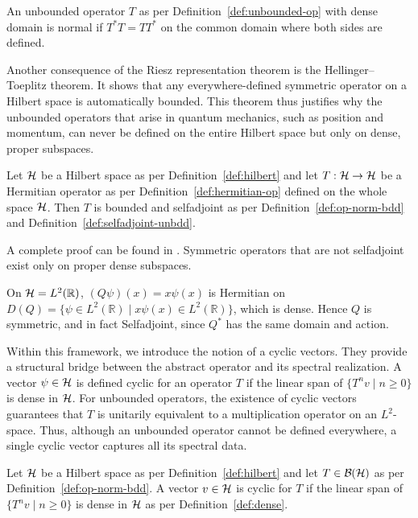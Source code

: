 \begin{definition}\label{def:normal-unbdd}
	An unbounded operator $T$ as per Definition~\ref{def:unbounded-op} with dense domain is normal if $T^{*}T=TT^{*}$ on the common domain where both sides are defined.
\end{definition}

\noindent Another consequence of the Riesz representation theorem is the Hellinger--Toeplitz theorem. It shows that any everywhere-defined symmetric operator on a Hilbert space is automatically bounded. This theorem thus justifies why the unbounded operators that arise in quantum mechanics, such as position and momentum, can never be defined on the entire Hilbert space but only on dense, proper subspaces.

\begin{theorem}\label{thm:helltoep}
	Let $\H$ be a Hilbert space as per Definition~\ref{def:hilbert} and let $T:\H\to\H$ be a Hermitian operator as per Definition~\ref{def:hermitian-op} defined on the whole space $\H$. Then $T$ is bounded and selfadjoint as per Definition~\ref{def:op-norm-bdd} and Definition~\ref{def:selfadjoint-unbdd}.
\end{theorem}

A complete proof can be found in \cite[Theorem 5.14]{morettiSpectralTheoryQuantum}. Symmetric operators that are not selfadjoint exist only on proper dense subspaces.

\begin{example}\label{ex:position-operator}
	On $\H=L^2(\mathbb{R})$, $(Q\psi)(x)=x\psi(x)$ is Hermitian on $D(Q)=\{\psi\in L^2(\mathbb{R})\mid x\psi(x)\in L^2(\mathbb{R})\}$, which is dense. Hence $Q$ is symmetric, and in fact Selfadjoint, since $Q^{*}$ has the same domain and action.
\end{example}

\noindent Within this framework, we introduce the notion of a cyclic vectors. They provide a structural bridge between the abstract operator and its spectral realization. A vector \(\psi\in\H\) is defined cyclic for an operator \(T\) if the  linear span of $\{T^nv\mid n\geq 0\}$ is dense in \(\H\). For unbounded operators, the existence of cyclic vectors guarantees that \(T\) is unitarily equivalent to a multiplication operator on an \(L^2\)-space. Thus, although an unbounded operator cannot be defined everywhere, a single cyclic vector captures all its spectral data.

\begin{definition}\label{def:cyclic-single}
	Let $\H$ be a Hilbert space as per Definition~\ref{def:hilbert} and let $T\in\mathcal{B}(\H)$ as per Definition~\ref{def:op-norm-bdd}. A vector $v\in\H$ is cyclic for $T$ if the linear span of $\{T^nv\mid n\geq 0\}$ is dense in $\H$ as per Definition~\ref{def:dense}.
\end{definition}

